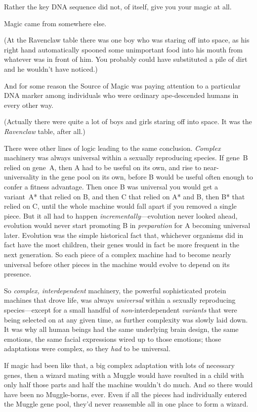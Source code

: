 Rather the key DNA sequence did not, of itself, give you your magic at all.

Magic came from somewhere else.

(At the Ravenclaw table there was one boy who was staring off into space, as his right hand automatically spooned some unimportant food into his mouth from whatever was in front of him. You probably could have substituted a pile of dirt and he wouldn't have noticed.)

And for some reason the Source of Magic was paying attention to a particular DNA marker among individuals who were ordinary ape-descended humans in every other way.

(Actually there were quite a lot of boys and girls staring off into space. It was the \emph{Ravenclaw} table, after all.)

There were other lines of logic leading to the same conclusion. \emph{Complex} machinery was always universal within a sexually reproducing species. If gene~B relied on gene~A, then A had to be useful on its own, and rise to near-universality in the gene pool on its own, before B would be useful often enough to confer a fitness advantage. Then once B was universal you would get a variant~A* that relied on B, and then C that relied on A* and B, then B* that relied on C, until the whole machine would fall apart if you removed a single piece. But it all had to happen \emph{incrementally}—evolution never looked ahead, evolution would never start promoting B in \emph{preparation} for A becoming universal later. Evolution was the simple historical fact that, whichever organisms did in fact have the most children, their genes would in fact be more frequent in the next generation. So each piece of a complex machine had to become nearly universal before other pieces in the machine would evolve to depend on its presence.

So \emph{complex, interdependent} machinery, the powerful sophisticated protein machines that drove life, was always \emph{universal} within a sexually reproducing species—except for a small handful of \emph{non}-interdependent \emph{variants} that were being selected on at any given time, as further complexity was slowly laid down. It was why all human beings had the same underlying brain design, the same emotions, the same facial expressions wired up to those emotions; those adaptations were complex, so they \emph{had} to be universal.

If magic had been like that, a big complex adaptation with lots of necessary genes, then a wizard mating with a Muggle would have resulted in a child with only half those parts and half the machine wouldn't do much. And so there would have been no Muggle-borns, ever. Even if all the pieces had individually entered the Muggle gene pool, they'd never reassemble all in one place to form a wizard.

